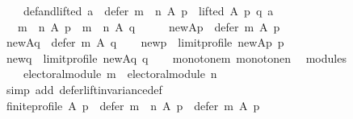 \begin{isabellebody}
\ \ \ \ def{\isacharunderscore}{\kern0pt}and{\isacharunderscore}{\kern0pt}lifted{\isacharcolon}{\kern0pt}\ {\isachardoublequoteopen}a\ {\isasymin}\ {\isacharparenleft}{\kern0pt}defer\ {\isacharparenleft}{\kern0pt}m\ {\isasymtriangleright}\ n{\isacharparenright}{\kern0pt}\ A\ p{\isacharparenright}{\kern0pt}\ {\isasymand}\ lifted\ A\ p\ q\ a{\isachardoublequoteclose}\isanewline
\ \ \ {\isachardoublequoteopen}{\isacharparenleft}{\kern0pt}m\ {\isasymtriangleright}\ n{\isacharparenright}{\kern0pt}\ A\ p\ {\isacharequal}{\kern0pt}\ {\isacharparenleft}{\kern0pt}m\ {\isasymtriangleright}\ n{\isacharparenright}{\kern0pt}\ A\ q{\isachardoublequoteclose}\isanewline
%
\isadelimproof
%
\endisadelimproof
%
\isatagproof
{}\isamarkupfalse%
\ {\isacharminus}{\kern0pt}\isanewline
\ \ \isamarkupfalse%
\ {\isacharquery}{\kern0pt}new{\isacharunderscore}{\kern0pt}Ap\ {\isacharequal}{\kern0pt}\ {\isachardoublequoteopen}defer\ m\ A\ p{\isachardoublequoteclose}\isanewline
\ \ \isamarkupfalse%
\ {\isacharquery}{\kern0pt}new{\isacharunderscore}{\kern0pt}Aq\ {\isacharequal}{\kern0pt}\ {\isachardoublequoteopen}defer\ m\ A\ q{\isachardoublequoteclose}\isanewline
\ \ \isamarkupfalse%
\ {\isacharquery}{\kern0pt}new{\isacharunderscore}{\kern0pt}p\ {\isacharequal}{\kern0pt}\ {\isachardoublequoteopen}limit{\isacharunderscore}{\kern0pt}profile\ {\isacharquery}{\kern0pt}new{\isacharunderscore}{\kern0pt}Ap\ p{\isachardoublequoteclose}\isanewline
\ \ \isamarkupfalse%
\ {\isacharquery}{\kern0pt}new{\isacharunderscore}{\kern0pt}q\ {\isacharequal}{\kern0pt}\ {\isachardoublequoteopen}limit{\isacharunderscore}{\kern0pt}profile\ {\isacharquery}{\kern0pt}new{\isacharunderscore}{\kern0pt}Aq\ q{\isachardoublequoteclose}\isanewline
\ \ \isamarkupfalse%
\ monotone{\isacharunderscore}{\kern0pt}m\ monotone{\isacharunderscore}{\kern0pt}n\ \isamarkupfalse%
\ modules{\isacharcolon}{\kern0pt}\isanewline
\ \ \ \ {\isachardoublequoteopen}electoral{\isacharunderscore}{\kern0pt}module\ m\ {\isasymand}\ electoral{\isacharunderscore}{\kern0pt}module\ n{\isachardoublequoteclose}\isanewline
\ \ \ \ \isamarkupfalse%
\ {\isacharparenleft}{\kern0pt}simp\ add{\isacharcolon}{\kern0pt}\ defer{\isacharunderscore}{\kern0pt}lift{\isacharunderscore}{\kern0pt}invariance{\isacharunderscore}{\kern0pt}def{\isacharparenright}{\kern0pt}\isanewline
\ \ \isamarkupfalse%
\ {\isachardoublequoteopen}finite{\isacharunderscore}{\kern0pt}profile\ A\ p\ {\isasymlongrightarrow}\ defer\ {\isacharparenleft}{\kern0pt}m\ {\isasymtriangleright}\ n{\isacharparenright}{\kern0pt}\ A\ p\ {\isasymsubseteq}\ defer\ m\ A\ p{\isachardoublequoteclose}\isanewline

\end{isabellebody}
